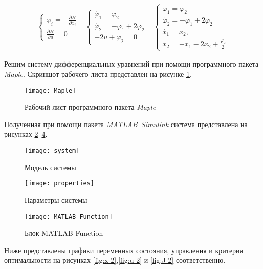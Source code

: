 \documentclass[14pt, a4paper]{extarticle}
\begin{document}
	$$\begin{matrix}
		\begin{cases}
			\dot{\varphi_i} = - \frac{\partial H}{\partial x_i} \\
			\frac{\partial H}{\partial u} = 0
		\end{cases} &
		\begin{cases}
			\dot{\varphi_1} = \varphi_2 \\
			\dot{\varphi_2} = - \varphi_1 + 2\varphi_2 \\
			-2u + \varphi_2 = 0
		\end{cases} &
		\begin{cases}
			\dot{\varphi_1} = \varphi_2 \\
			\dot{\varphi_2} = - \varphi_1 + 2\varphi_2 \\
			\dot{x_1} = x_2,\\
			\dot{x_2} = -x_1 - 2x_2 + \frac{\varphi_2}{2}
		\end{cases}
	\end{matrix}$$
	
	Решим систему дифференциальных уравнений при помощи программного пакета \textit{Maple}. Скриншот рабочего листа представлен на рисунке \ref{fig:Maple}.
	
	\begin{figure}[H]
		\centering
		\texttt{[image: Maple]}
		\caption{Рабочий лист программного пакета \textit{Maple}}
		\label{fig:Maple}
	\end{figure}
	
	Полученная при помощи пакета \textit{MATLAB~Simulink} система представлена на рисунках \ref{fig:system}--\ref{fig:MATLAB-Function}.
	
	\begin{figure}[H]
		\centering
		\texttt{[image: system]}
		\caption{Модель системы}
		\label{fig:system}
	\end{figure}
	
	\begin{figure}[H]
		\centering
		\texttt{[image: properties]}
		\caption{Параметры системы}
		\label{fig:properties}
	\end{figure}
	
	\begin{figure}[H]
		\centering
		\texttt{[image: MATLAB-Function]}
		\caption{Блок MATLAB-Function}
		\label{fig:MATLAB-Function}
	\end{figure}
	
	Ниже представлены графики переменных состояния, управления и критерия оптимальности на рисунках \ref{fig:x-2},\ref{fig:u-2} и \ref{fig:J-2} соответственно.
	
\end{document}
